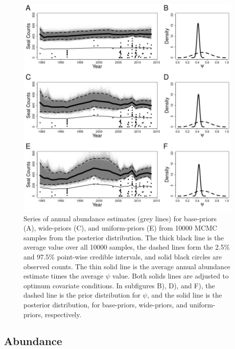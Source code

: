 \documentclass[]{risa}\usepackage[]{graphicx}\usepackage[]{color}
\begin{document}
\begin{figure}
\centerline{
 \includegraphics[width=5in]{plot-trendlines-1.jpeg}
}
\caption{Series of annual abundance estimates (grey lines) for base-priors (A), wide-priors (C), and uniform-priors (E) from 10000 MCMC samples from the posterior distribution.  The thick black line is the average value over all 10000 samples, the dashed lines form the 2.5\% and 97.5\% point-wise credible intervals, and solid black circles are observed counts. The thin solid line is the average annual abundance estimate times the average $\psi$ value.  Both solids lines are adjusted to optimum covariate conditions. In subfigures B), D), and F), the dashed line is the prior distribution for $\psi$, and the solid line is the posterior distribution, for base-priors, wide-priors, and uniform-priors, respectively.}
\label{plot-trendlines}         
\end{figure}

\subsection{Abundance} \label{sec:abundance}
\end{document}
